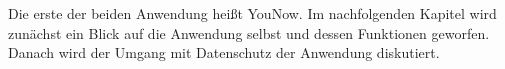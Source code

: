 Die erste der beiden Anwendung heißt YouNow. Im nachfolgenden Kapitel wird
zunächst ein Blick auf die Anwendung selbst und dessen Funktionen geworfen.
Danach wird der Umgang mit Datenschutz der Anwendung diskutiert.
